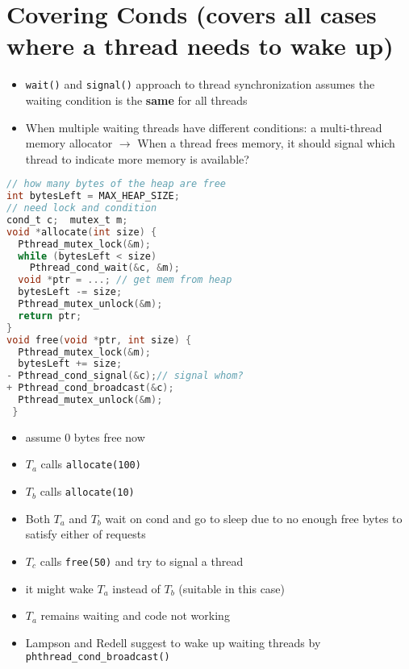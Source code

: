 \section*{Covering Conds (covers all cases where a thread needs to wake up)}
\begin{itemize}
\item \texttt{wait()} and \texttt{signal()} approach to thread synchronization assumes the waiting condition is the \textbf{same} for all threads
\item When multiple waiting threads have different conditions: a multi-thread memory allocator $\to$ When a thread frees memory, it should signal which thread to indicate more memory is available?
\end{itemize}
\begin{minipage}{.6\linewidth}
\begin{lstlisting}[language=c,xleftmargin=4pt]
// how many bytes of the heap are free
int bytesLeft = MAX_HEAP_SIZE;
// need lock and condition
cond_t c;  mutex_t m;
void *allocate(int size) {
  Pthread_mutex_lock(&m);
  while (bytesLeft < size)
    Pthread_cond_wait(&c, &m);
  void *ptr = ...; // get mem from heap
  bytesLeft -= size;
  Pthread_mutex_unlock(&m);
  return ptr;
}
void free(void *ptr, int size) {
  Pthread_mutex_lock(&m);
  bytesLeft += size;
- Pthread_cond_signal(&c);// signal whom?
+ Pthread_cond_broadcast(&c);
  Pthread_mutex_unlock(&m);
 }
\end{lstlisting}
\end{minipage}
\begin{minipage}{.4\linewidth}
  \flushleft
  \begin{itemize}
  \item assume 0 bytes free now
  \item $T_a$ calls \texttt{allocate(100)}
  \item $T_b$ calls \texttt{allocate(10)}
  \item Both $T_a$ and $T_b$ wait on cond and go to sleep due to no enough free bytes to satisfy either of requests
  \item $T_c$ calls \texttt{free(50)} and try to signal a thread
  \item it might wake $T_a$ instead of $T_b$ (suitable in this case)
  \item $T_a$ remains waiting and code not working
  \item Lampson and Redell suggest to wake up  waiting threads by \texttt{phthread\_cond\_broadcast()}
  \end{itemize}
\end{minipage}
